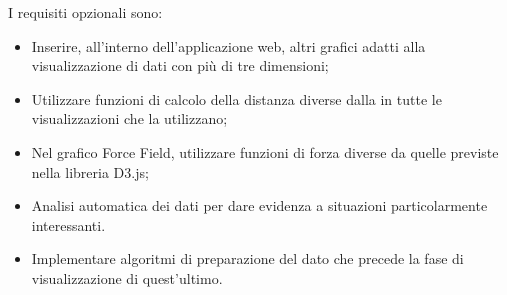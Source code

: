 \documentclass[../analisi-dei-requisiti.tex]{subfiles}
\begin{document}
\setlength{\parindent}{0pt}I requisiti opzionali sono:
\begin{itemize}
    \item Inserire, all'interno dell'applicazione web, altri grafici adatti alla visualizzazione di dati con più di tre dimensioni;
    \item Utilizzare funzioni di calcolo della distanza diverse dalla  in tutte le visualizzazioni che la utilizzano;
    \item Nel grafico Force Field, utilizzare funzioni di forza diverse da quelle previste nella libreria D3.js;
    \item Analisi automatica dei dati per dare evidenza a situazioni particolarmente interessanti.
    \item Implementare algoritmi di preparazione del dato che precede la fase di visualizzazione di quest'ultimo.
\end{itemize}
\end{document}
